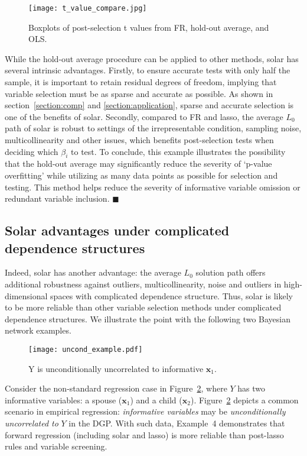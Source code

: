 \documentclass[12pt]{article}
\begin{document}
\begin{figure}[h]
%
  \centering
%
  \texttt{[image: t\_value\_compare.jpg]}
%
  \caption{Boxplots of post-selection t values from FR, hold-out average, and OLS.}
%
  \label{fig:t_value_compare}
%
\end{figure}

While the hold-out average procedure can be applied to other methods, solar has several intrinsic advantages. Firstly, to ensure accurate tests with only half the sample, it is important to retain residual degrees of freedom, implying that variable selection must be as sparse and accurate as possible. As shown in section~\ref{section:comp} and \ref{section:application}, sparse and accurate selection is one of the benefits of solar. Secondly, compared to FR and lasso, the average $L_0$ path of solar is robust to settings of the irrepresentable condition, sampling noise, multicollinearity and other issues, which benefits post-selection tests when deciding which $\beta_i$ to test. To conclude, this example illustrates the possibility that the hold-out average may significantly reduce the severity of `p-value overfitting' while utilizing as many data points as possible for selection and testing. This method helps reduce the severity of informative variable omission or redundant variable inclusion. $\blacksquare$

\subsection{Solar advantages under complicated dependence structures\label{section:example}}

Indeed, solar has another advantage: the average $L_0$ solution path offers additional robustness against outliers, multicollinearity, noise and outliers in high-dimensional spaces with complicated dependence structure. Thus, solar is likely to be more reliable than other variable selection methods under complicated dependence structures. We illustrate the point with the following two Bayesian network examples.

\begin{figure}[h]
%
  \centering
  \texttt{[image: uncond\_example.pdf]}
  \caption{Y is unconditionally uncorrelated to informative $\mathbf{x}_1$.}
  \label{fig:uncond_example}
%
\end{figure}

Consider the non-standard regression case in Figure~\ref{fig:uncond_example}, where $Y$ has two informative variables: a spouse ($\mathbf{x}_1$) and a child ($\mathbf{x}_2$). Figure~\ref{fig:uncond_example} depicts a common scenario in empirical regression: \emph{informative variables} may be \emph{unconditionally uncorrelated to} $Y$ in the DGP. With such data, Example~4 demonstrates that forward regression (including solar and lasso) is more reliable than post-lasso rules and variable screening.
\end{document}
